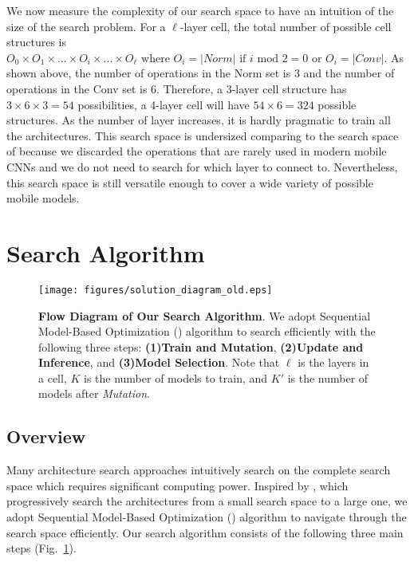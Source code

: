\documentclass[runningheads]{llncs}
\begin{document}
We now measure the complexity of our search space to have an intuition of the size of the search problem. For a $\ell$-layer cell, the total number of possible cell structures is $O_{0} \times O_{1} \times ... \times O_{i} \times ... \times O_{\ell} \text{ where } O_{i} = \left | Norm \right | \text{ if } i \text{ mod } 2 = 0 \text{ or } O_{i} = \left | Conv \right |$. As shown above, the number of operations in the Norm set is 3 and the number of operations in the Conv set is 6. Therefore, a 3-layer cell structure has $3 \times 6 \times 3 = 54$ possibilities, a 4-layer cell will have $54 \times 6 = 324$ possible structures. As the number of layer increases, it is hardly pragmatic to train all the architectures. This search space is undersized comparing to the search space of \cite{zoph2017learning,liu2017progressive} because we discarded the operations that are rarely used in modern mobile CNNs and we do not need to search for which layer to connect to. Nevertheless, this search space is still versatile enough to cover a wide variety of possible mobile models.

\section{Search Algorithm}\begin{figure}[h]
\begin{center}
\texttt{[image: figures/solution\_diagram\_old.eps]}
\end{center}
\caption{\textbf{Flow Diagram of Our Search Algorithm}.
We adopt Sequential Model-Based Optimization (\cite{hutter2011sequential}) algorithm to search efficiently with the following three steps: \textbf{(1)Train and Mutation}, \textbf{(2)Update and Inference}, and \textbf{(3)Model Selection}. Note that $\ell$ is the layers in a cell, $K$ is the number of models to train, and ${K}'$ is the number of models after \textit{Mutation}.}
\label{fig.diagram}
\end{figure}\subsection{Overview}
Many architecture search approaches intuitively search on the complete search space which requires significant computing power. Inspired by \cite{liu2017progressive}, which progressively search the architectures from a small search space to a large one, we adopt Sequential Model-Based Optimization (\cite{hutter2011sequential}) algorithm to navigate through the search space efficiently. Our search algorithm consists of the following three main steps (Fig.~\ref{fig.diagram}).
\end{document}
